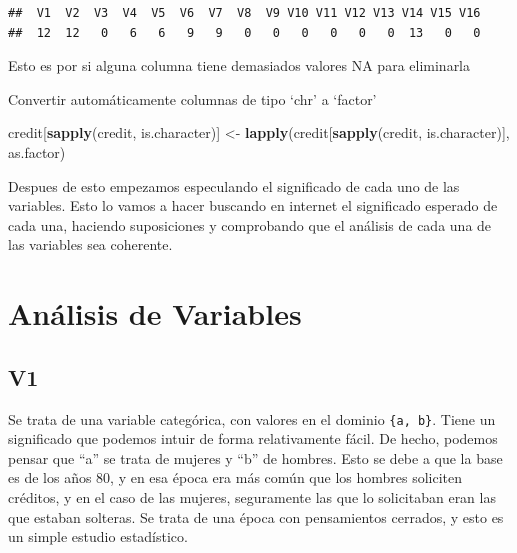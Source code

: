 \documentclass[
]{article}
\newenvironment{Shaded}{\begin{snugshade}}{\end{snugshade}}
\newcommand{\CommentTok}[1]{\textcolor[rgb]{0.56,0.35,0.01}{\textit{#1}}}
\newcommand{\FunctionTok}[1]{\textcolor[rgb]{0.13,0.29,0.53}{\textbf{#1}}}
\newcommand{\NormalTok}[1]{#1}
\newcommand{\OtherTok}[1]{\textcolor[rgb]{0.56,0.35,0.01}{#1}}
\newcommand{\SpecialCharTok}[1]{\textcolor[rgb]{0.81,0.36,0.00}{\textbf{#1}}}
\begin{document}
\begin{verbatim}
##  V1  V2  V3  V4  V5  V6  V7  V8  V9 V10 V11 V12 V13 V14 V15 V16 
##  12  12   0   6   6   9   9   0   0   0   0   0   0  13   0   0
\end{verbatim}

Esto es por si alguna columna tiene demasiados valores NA para
eliminarla

Convertir automáticamente columnas de tipo `chr' a `factor'

\begin{Shaded}
\begin{Highlighting}[]
\NormalTok{credit[}\FunctionTok{sapply}\NormalTok{(credit, is.character)] }\OtherTok{\textless{}{-}} \FunctionTok{lapply}\NormalTok{(credit[}\FunctionTok{sapply}\NormalTok{(credit, is.character)], as.factor)}
\end{Highlighting}
\end{Shaded}

Despues de esto empezamos especulando el significado de cada uno de las
variables. Esto lo vamos a hacer buscando en internet el significado
esperado de cada una, haciendo suposiciones y comprobando que el
análisis de cada una de las variables sea coherente.

\hypertarget{anuxe1lisis-de-variables}{%
\section{Análisis de Variables}\label{anuxe1lisis-de-variables}}

\hypertarget{v1}{%
\subsection{V1}\label{v1}}

Se trata de una variable categórica, con valores en el dominio
\texttt{\{a,\ b\}}. Tiene un significado que podemos intuir de forma
relativamente fácil. De hecho, podemos pensar que ``a'' se trata de
mujeres y ``b'' de hombres. Esto se debe a que la base es de los años
80, y en esa época era más común que los hombres soliciten créditos, y
en el caso de las mujeres, seguramente las que lo solicitaban eran las
que estaban solteras. Se trata de una época con pensamientos cerrados, y
esto es un simple estudio estadístico.

\begin{Shaded}
\end{Shaded}
\end{document}

